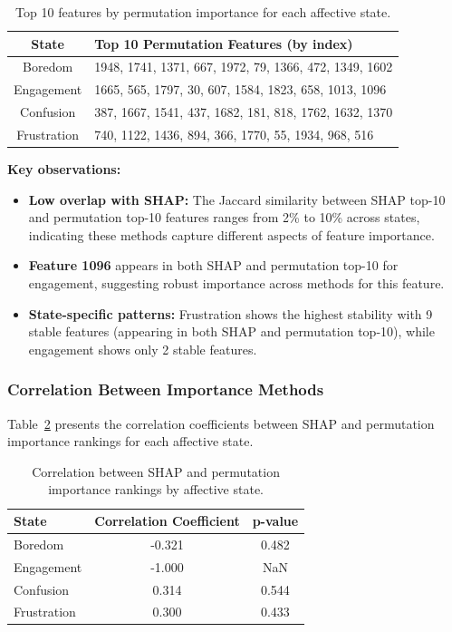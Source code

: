 \begin{table}[t]
\centering
\caption{Top 10 features by permutation importance for each affective state.}
\label{tab:perm-top-features}
\begin{tabular}{cl}
\toprule
\textbf{State} & \textbf{Top 10 Permutation Features (by index)} \\
\midrule
Boredom & 1948, 1741, 1371, 667, 1972, 79, 1366, 472, 1349, 1602 \\
Engagement & 1665, 565, 1797, 30, 607, 1584, 1823, 658, 1013, 1096 \\
Confusion & 387, 1667, 1541, 437, 1682, 181, 818, 1762, 1632, 1370 \\
Frustration & 740, 1122, 1436, 894, 366, 1770, 55, 1934, 968, 516 \\
\bottomrule
\end{tabular}
\end{table}

\textbf{Key observations:}
\begin{itemize}
    \item \textbf{Low overlap with SHAP:} The Jaccard similarity between SHAP top-10 and permutation top-10 features ranges from 2\% to 10\% across states, indicating these methods capture different aspects of feature importance.

    \item \textbf{Feature 1096} appears in both SHAP and permutation top-10 for engagement, suggesting robust importance across methods for this feature.

    \item \textbf{State-specific patterns:} Frustration shows the highest stability with 9 stable features (appearing in both SHAP and permutation top-10), while engagement shows only 2 stable features.
\end{itemize}

\subsubsection{Correlation Between Importance Methods}
\label{sec:importance-correlation}

Table~\ref{tab:importance-correlation} presents the correlation coefficients between SHAP and permutation importance rankings for each affective state.

\begin{table}[t]
\centering
\caption{Correlation between SHAP and permutation importance rankings by affective state.}
\label{tab:importance-correlation}
\begin{tabular}{lcc}
\toprule
\textbf{State} & \textbf{Correlation Coefficient} & \textbf{p-value} \\
\midrule
Boredom & -0.321 & 0.482 \\
Engagement & -1.000 & NaN \\
Confusion & 0.314 & 0.544 \\
Frustration & 0.300 & 0.433 \\
\bottomrule
\end{tabular}
\end{table}

